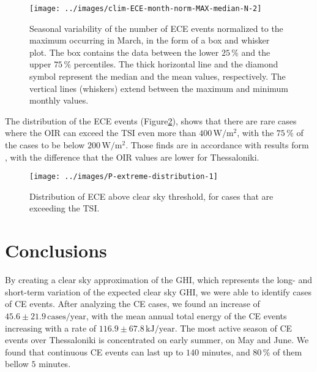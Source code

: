 \documentclass[preprint, 5p,
authoryear]{elsarticle} %
\begin{document}
\begin{figure}

{\centering \texttt{[image: ../images/clim-ECE-month-norm-MAX-median-N-2]} 

}

\caption{Seasonal variability of the number of ECE events normalized to the maximum occurring in March, in the form of a box and whisker plot. The box contains the data between the lower $25\,\%$ and the upper $75\,\%$ percentiles. The thick horizontal line and the diamond symbol represent the median and the mean values, respectively. The vertical lines (whiskers) extend between the maximum and minimum monthly values.}\label{fig:relative-month-occurancies-ECE}
\end{figure}

The distribution of the ECE events
(Figure\nobreakspace{}\ref{fig:P-extreme-distribution}), shows that
there are rare cases where the OIR can exceed the TSI even more than
\(400\,\text{W}/\text{m}^2\), with the \(75\,\%\) of the cases to be
below \(200\,\text{W}/\text{m}^2\). Those finds are in accordance with
results form \citet{Vamvakas2020}, with the difference that the OIR
values are lower for Thessaloniki.

\begin{figure}

{\centering \texttt{[image: ../images/P-extreme-distribution-1]} 

}

\caption{Distribution of ECE above clear sky threshold, for cases that are exceeding the TSI.}\label{fig:P-extreme-distribution}
\end{figure}

\hypertarget{conclusions}{%
\section{Conclusions}\label{conclusions}}

By creating a clear sky approximation of the GHI, which represents the
long- and short-term variation of the expected clear sky GHI, we were
able to identify cases of CE events. After analyzing the CE cases, we
found an increase of \(45.6\pm 21.9\,\text{cases}/\text{year}\), with
the mean annual total energy of the CE events increasing with a rate of
\(116.9\pm 67.8\,\text{kJ}/\text{year}\). The most active season of CE
events over Thessaloniki is concentrated on early summer, on May and
June. We found that continuous CE events can last up to \(140\) minutes,
and \(80\,\%\) of them bellow \(5\) minutes.
\end{document}
